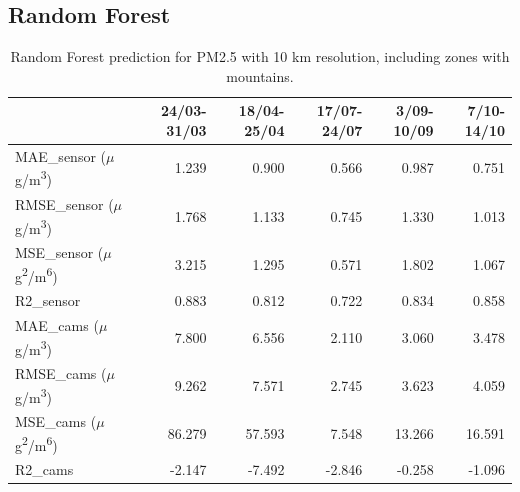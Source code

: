 \subsection{Random Forest}
\begin{table}[H]
\begin{tabular}{lrrrrr}
\toprule
 &  24/03-31/03 &  18/04-25/04 &  17/07-24/07 &  3/09-10/09 &  7/10-14/10 \\
\midrule
 MAE\_sensor ($\mu$g/m\textsuperscript{3})&        1.239 &        0.900 &        0.566 &       0.987 &       0.751 \\
RMSE\_sensor ($\mu$g/m\textsuperscript{3})&        1.768 &        1.133 &        0.745 &       1.330 &       1.013 \\
 MSE\_sensor ($\mu$g\textsuperscript{2}/m\textsuperscript{6})&        3.215 &        1.295 &        0.571 &       1.802 &       1.067 \\
  R2\_sensor &        0.883 &        0.812 &        0.722 &       0.834 &       0.858 \\
   MAE\_cams ($\mu$g/m\textsuperscript{3})&        7.800 &        6.556 &        2.110 &       3.060 &       3.478 \\
  RMSE\_cams ($\mu$g/m\textsuperscript{3})&        9.262 &        7.571 &        2.745 &       3.623 &       4.059 \\
   MSE\_cams ($\mu$g\textsuperscript{2}/m\textsuperscript{6})&       86.279 &       57.593 &        7.548 &      13.266 &      16.591 \\
    R2\_cams &       -2.147 &       -7.492 &       -2.846 &      -0.258 &      -1.096 \\
\bottomrule
\end{tabular}
\caption{Random Forest prediction for PM2.5 with 10 km resolution, including zones with mountains.}
\end{table}
